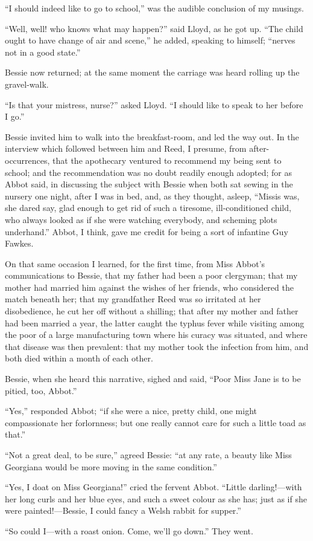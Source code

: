 \enquote{I should indeed like to go to school,} was the audible
conclusion of my musings.

\enquote{Well, well! who knows what may happen?} said \Mr{} Lloyd, as he
got up.  \enquote{The child ought to have change of air and scene,} he
added, speaking to himself; \enquote{nerves not in a good state.}

Bessie now returned; at the same moment the carriage was heard rolling
up the gravel-walk.

\enquote{Is that your mistress, nurse?} asked \Mr{} Lloyd.  \enquote{I
should like to speak to her before I go.}

Bessie invited him to walk into the breakfast-room, and led the way
out.  In the interview which followed between him and \Mrs{} Reed, I
presume, from after-occurrences, that the apothecary ventured to
recommend my being sent to school; and the recommendation was no doubt
readily enough adopted; for as Abbot said, in discussing the subject
with Bessie when both sat sewing in the nursery one night, after I was
in bed, and, as they thought, asleep, \enquote{Missis was, she dared
say, glad enough to get rid of such a tiresome, ill-conditioned child,
who always looked as if she were watching everybody, and scheming plots
underhand.}  Abbot, I think, gave me credit for being a sort of
infantine Guy Fawkes.

On that same occasion I learned, for the first time, from Miss Abbot's
communications to Bessie, that my father had been a poor clergyman; that
my mother had married him against the wishes of her friends, who
considered the match beneath her; that my grandfather Reed was so
irritated at her disobedience, he cut her off without a shilling; that
after my mother and father had been married a year, the latter caught
the typhus fever while visiting among the poor of a large manufacturing
town where his curacy was situated, and where that disease was then
prevalent: that my mother took the infection from him, and both died
within a month of each other.

Bessie, when she heard this narrative, sighed and said, \enquote{Poor
Miss Jane is to be pitied, too, Abbot.}

\enquote{Yes,} responded Abbot; \enquote{if she were a nice, pretty
child, one might compassionate her forlornness; but one really cannot
care for such a little toad as that.}

\enquote{Not a great deal, to be sure,} agreed Bessie: \enquote{at any
rate, a beauty like Miss Georgiana would be more moving in the same
condition.}

\enquote{Yes, I doat on Miss Georgiana!} cried the fervent Abbot. 
\enquote{Little darling!---with her long curls and her blue eyes, and
such a sweet colour as she has; just as if she were painted!---Bessie, I
could fancy a Welsh rabbit for supper.}

\enquote{So could I---with a roast onion.  Come, we'll go down.}  They
went.
